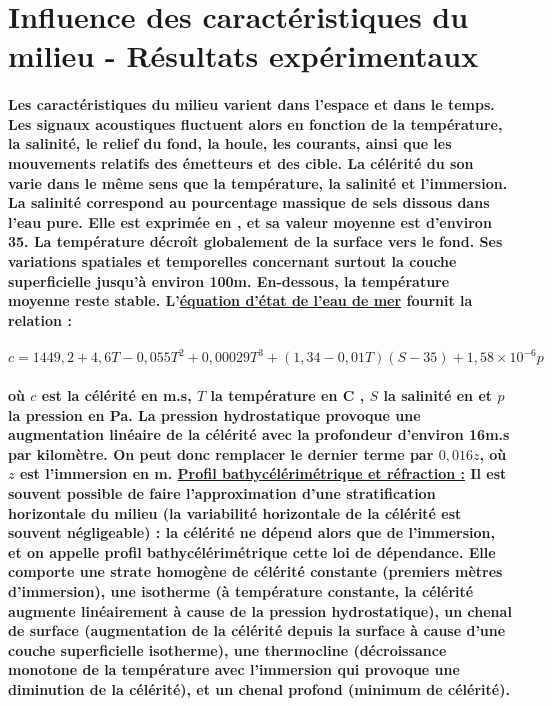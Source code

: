 \documentclass[a4paper,11pt]{article}
\begin{document}
\section{Influence des caract\'{e}ristiques du milieu - R\'{e}sultats exp\'{e}rimentaux}
\paragraph{\normalfont Les caract\'{e}ristiques du milieu varient dans l'espace et dans le temps. Les signaux acoustiques fluctuent alors en fonction de la temp\'{e}rature, la salinit\'{e}, le relief du fond, la houle, les courants, ainsi que les mouvements relatifs des \'{e}metteurs et des cible. La c\'{e}l\'{e}rit\'{e} du son varie dans le m\^{e}me sens que la temp\'{e}rature, la salinit\'{e} et l'immersion. La salinit\'{e} correspond au pourcentage massique de sels dissous dans l'eau pure. Elle est exprim\'{e}e en \textperthousand, et sa valeur moyenne est d'environ 35\textperthousand. La temp\'{e}rature d\'{e}cro\^{i}t globalement de la surface vers le fond. Ses variations spatiales et temporelles concernant surtout la couche superficielle jusqu'\`{a} environ 100m.  En-dessous, la temp\'{e}rature moyenne reste stable. \newline \newline
L'\textbf{\underline{\'{e}quation d'\'{e}tat de l'eau de mer}} fournit la relation :}
\[c=1449,2+4,6T-0,055T^2+0,00029T^3+(1,34-0,01T)(S-35)+1,58\times10^{-6}p\]
\paragraph{\normalfont o\`{u} $c$ est la c\'{e}l\'{e}rit\'{e} en m.s, $T$ la temp\'{e}rature en \degre C , $S$ la salinit\'{e} en \textperthousand \space et $p$ la pression en Pa. La pression hydrostatique provoque une augmentation lin\'{e}aire de la c\'{e}l\'{e}rit\'{e} avec la profondeur d'environ 16m.s par kilom\`{e}tre. On peut donc remplacer le dernier terme par $0,016z$, o\`{u} $z$ est l'immersion en m. \newline \newline
\textbf{\underline{Profil bathyc\'{e}l\'{e}rim\'{e}trique et r\'{e}fraction :}} \newline \newline
Il est souvent possible de faire l'approximation d'une \textbf{stratification horizontale du milieu} (la variabilit\'{e} horizontale de la c\'{e}l\'{e}rit\'{e} est souvent n\'{e}gligeable) : \textbf{la c\'{e}l\'{e}rit\'{e} ne d\'{e}pend alors que de l'immersion}, et on appelle \textbf{profil bathyc\'{e}l\'{e}rim\'{e}trique} cette loi de d\'{e}pendance. Elle comporte une \textbf{strate homog\`{e}ne de c\'{e}l\'{e}rit\'{e} constante} (premiers m\`{e}tres d'immersion), une \textbf{isotherme} (\`{a} temp\'{e}rature constante, la c\'{e}l\'{e}rit\'{e} augmente lin\'{e}airement \`{a} cause de la pression hydrostatique), un \textbf{chenal de surface} (augmentation de la c\'{e}l\'{e}rit\'{e} depuis la surface \`{a} cause d'une couche superficielle isotherme), une \textbf{thermocline} (d\'{e}croissance monotone de la temp\'{e}rature avec l'immersion qui provoque une diminution de la c\'{e}l\'{e}rit\'{e}), et un \textbf{chenal profond} (minimum de c\'{e}l\'{e}rit\'{e}).}
\end{document}
